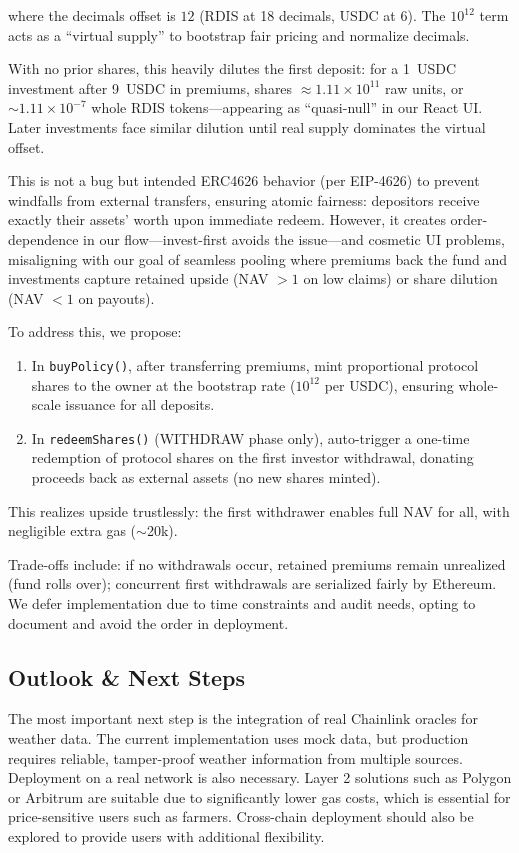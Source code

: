 \documentclass[11pt,a4paper]{article}
\begin{document}
        where the decimals offset is $12$ (RDIS at 18 decimals, USDC at 6).
        The $10^{12}$ term acts as a ``virtual supply'' to bootstrap fair pricing and normalize decimals.

        With no prior shares, this heavily dilutes the first deposit: for a 1~USDC investment after 9~USDC in premiums, shares $\approx 1.11 \times 10^{11}$ raw units, or $\sim 1.11 \times 10^{-7}$ whole RDIS tokens---appearing as ``quasi-null'' in our React UI.
        Later investments face similar dilution until real supply dominates the virtual offset.

        This is not a bug but intended ERC4626 behavior (per EIP-4626) to prevent windfalls from external transfers, ensuring atomic fairness: depositors receive exactly their assets' worth upon immediate redeem.
        However, it creates order-dependence in our flow---invest-first avoids the issue---and cosmetic UI problems, misaligning with our goal of seamless pooling where premiums back the fund and investments capture retained upside (NAV $> 1$ on low claims) or share dilution (NAV $< 1$ on payouts).

        To address this, we propose:
        \begin{enumerate}
            \item In \texttt{buyPolicy()}, after transferring premiums, mint proportional protocol shares to the owner at the bootstrap rate ($10^{12}$ per USDC), ensuring whole-scale issuance for all deposits.
            \item In \texttt{redeemShares()} (WITHDRAW phase only), auto-trigger a one-time redemption of protocol shares on the first investor withdrawal, donating proceeds back as external assets (no new shares minted).
        \end{enumerate}
        This realizes upside trustlessly: the first withdrawer enables full NAV for all, with negligible extra gas ($\sim$20k).

        Trade-offs include: if no withdrawals occur, retained premiums remain unrealized (fund rolls over); concurrent first withdrawals are serialized fairly by Ethereum.
        We defer implementation due to time constraints and audit needs, opting to document and avoid the order in deployment.

        \subsection{Outlook \& Next Steps}\label{subsec:outlook}
		The most important next step is the integration of real Chainlink oracles for weather data. 
		The current implementation uses mock data, but production requires reliable, tamper-proof weather information from multiple sources. 
		Deployment on a real network is also necessary. 
		Layer 2 solutions such as Polygon or Arbitrum are suitable due to significantly lower gas costs, which is essential for price-sensitive users such as farmers. 
		Cross-chain deployment should also be explored to provide users with additional flexibility. 
\end{document}
